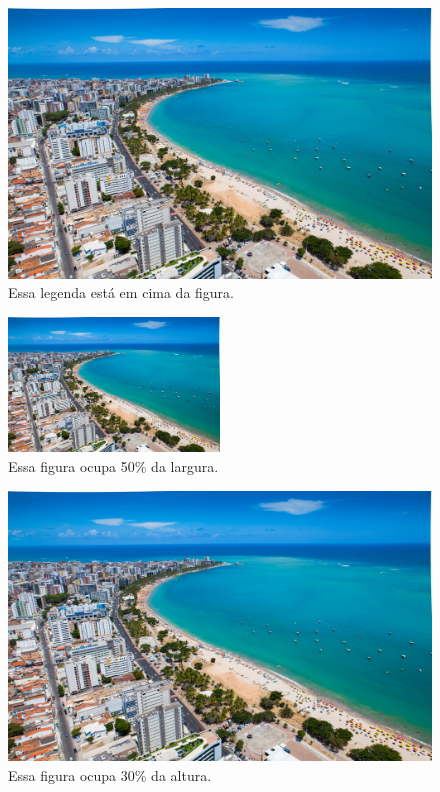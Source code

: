 \documentclass{abntex2}
\begin{document}
\begin{figure}[h]
	\centering
	\caption{Essa legenda está em cima da figura.}
	\includegraphics[scale=0.1]{maceio.jpg}
\end{figure}

\begin{figure}[h]
	\centering
	\includegraphics[width=0.5\textwidth]{maceio.jpg}
	\caption{Essa figura ocupa 50\% da largura.}
\end{figure}

\begin{figure}[h]
	\centering
	\includegraphics[height=0.3\textheight]{maceio.jpg}
	\caption{Essa figura ocupa 30\% da altura.}
\end{figure}
\end{document}
